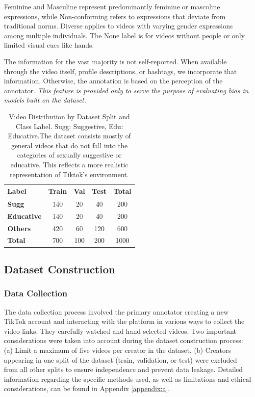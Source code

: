 \documentclass[11pt]{article}
\begin{document}
Feminine and Masculine represent predominantly feminine or masculine expressions, while Non-conforming refers to expressions that deviate from traditional norms. Diverse applies to videos with varying gender expressions among multiple individuals. The None label is for videos without people or only limited visual cues like hands.

The information for the vast majority is not self-reported. When available through the video itself, profile descriptions, or hashtags, we incorporate that information. Otherwise, the annotation is based on the perception of the annotator. {\em This feature is provided only to serve the purpose of evaluating bias in models built on the dataset.}

\begin{table}
\centering
\begin{tabular}{lcccc}
\hline
\textbf{Label} &  \textbf{Train} & \textbf{Val} & \textbf{Test} & \textbf{Total}\\
\hline
\textbf{Sugg} & 140 &	20 & 40 &  200\\
\textbf{Educative} & 140 & 20 & 40 & 200 \\
\textbf{Others} & 420 &	60 & 120 & 600 \\
\hline
\textbf{Total} & 700 &100 &	200 & 1000\\
\hline
\end{tabular}
\caption{Video Distribution by Dataset Split and Class Label.  Sugg: Suggestive, Edu: Educative.The dataset consists mostly of general videos that do not fall into the categories of sexually suggestive or educative. This reflects a more realistic representation of Tiktok's environment.}

\end{table}

\subsection{Dataset Construction}
\subsubsection*{Data Collection}

The data collection process involved the primary annotator creating a new TikTok account and interacting with the platform in various ways to collect the video links. They
carefully watched and hand-selected videos. Two important considerations were taken into account during the dataset construction process: (a) Limit a maximum of five videos per creator in the dataset. (b) Creators appearing in one split of the dataset (train, validation, or test) were excluded from all other splits to ensure independence and prevent data leakage. Detailed information regarding the specific methods used, as well as limitations and ethical considerations, can be found in Appendix \ref{appendix:a}.
\end{document}
